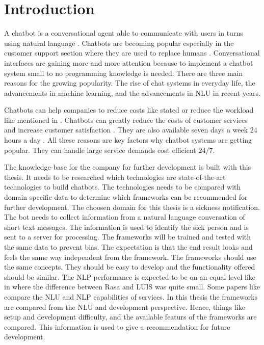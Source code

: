 
\section{Introduction} %
A chatbot is a conversational agent able to communicate with users in turns 
using natural language \cite{evaluateChatbotsShawar2007, shawar2007chatbots, huang2007extracting, gregori2017evaluation}.
Chatbots are becoming popular especially in the customer support section where they are used to replace humans \cite{GO2019304}.
Conversational interfaces are gaining more and more attention because to implement a chatbot system small 
to no programming knowledge is needed. \cite{braunEvaluatingNLU}
There are three main reasons for the growing popularity.
The rise of chat systems in everyday life, the advancements in machine learning, and the 
advancements in NLU in recent years. \cite{braunEvaluatingNLU}

Chatbots can help companies to reduce costs like \citet{rahman2017programming} stated
or reduce the workload like mentioned in \citet{deshpande2017survey}.
Chatbots can greatly reduce the costs of customer services and increase customer satisfaction \cite{singhbuilding}. 
They are also available seven days a week 24 hours a day \cite{singhbuilding}.
All these reasons are key factors why chatbot systems are getting popular.
They can handle large service demands cost efficient 24/7.

The knowledge-base for the company for further development is built with this thesis.
It needs to be researched which technologies are state-of-the-art technologies to build chatbots.
The technologies needs to be compared with domain specific data to determine which frameworks can be 
recommended for further development.
The choosen domain for this thesis is a sickness notification.
The bot needs to collect information from a natural language conversation of short text messages.
The information is used to identify the sick person and is sent to a server for processing.
The frameworks will be trained and tested with the same data to prevent bias.
The expectation is that the end result looks and feels the same way independent from the framework.
The frameworks should use the same concepts.
They should be easy to develop and the functionality offered should be similar.
The NLP performance is expected to be on an equal level like in \citet{braunEvaluatingNLU} where the difference 
between Rasa and LUIS was quite small.
Some papers like \citet{braunEvaluatingNLU} compare the NLU and NLP capabilities of services.
In this thesis the frameworks are compared from the NLU and development perspective.
Hence, things like setup and development difficulty, and 
the available featurs of the frameworks are compared.
This information is used to give a recommendation for future development.


